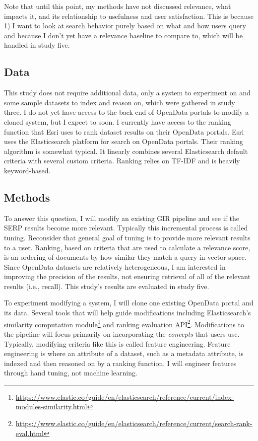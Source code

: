 Note that until this point, my methods have not discussed relevance, what impacts it, and its relationship to usefulness and user satisfaction. This is because 1) I want to look at search behavior purely based on what and how users query \underline{and} because I don't yet have a relevance baseline to compare to, which will be handled in study five.

\subsection{Data}
This study does not require additional data, only a system to experiment on and some sample datasets to index and reason on, which were gathered in study three. I do not yet have access to the back end of OpenData portals to modify a cloned system, but I expect to soon. I currently have access to the ranking function that Esri uses to rank dataset results on their OpenData portals. Esri uses the Elasticsearch platform for search on OpenData portals. Their ranking algorithm is somewhat typical. It linearly combines several Elasticsearch default criteria with several custom criteria. Ranking relies on TF-IDF and is heavily keyword-based. 

\subsection{Methods}

To answer this question, I will modify an existing GIR pipeline and see if the SERP results become more relevant. Typically this incremental process is called tuning. Reconsider that general goal of tuning is to provide more relevant results to a user. Ranking, based on criteria that are used to calculate a relevance score, is an ordering of documents by how similar they match a query in vector space. Since OpenData datasets are relatively heterogeneous, I am interested in improving the precision of the results, not ensuring retrieval of all of the relevant results (i.e., recall). This study's results are evaluated in study five.

To experiment modifying a system, I will clone one existing OpenData portal and its data. Several tools that will help guide modifications including Elasticsearch's similarity computation module\footnote{\url{https://www.elastic.co/guide/en/elasticsearch/reference/current/index-modules-similarity.html}} and  ranking evaluation API\footnote{\url{https://www.elastic.co/guide/en/elasticsearch/reference/current/search-rank-eval.html}}. Modifications to the pipeline will focus primarily on incorporating the \emph{concepts} that users use. Typically, modifying criteria like this is called feature engineering. Feature engineering is where an attribute of a dataset, such as a metadata attribute, is indexed and then reasoned on by a ranking function. I will engineer features through hand tuning, not machine learning.

